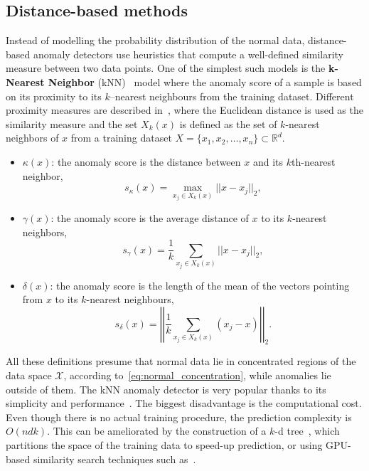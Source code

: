 \subsection{Distance-based methods}
Instead of modelling the probability distribution of the normal data, distance-based anomaly detectors use heuristics that compute a well-defined similarity measure between two data points. One of the simplest such models is the \textbf{k-Nearest Neighbor} (kNN)~\cite{ramaswamy2000efficient} model where the anomaly score of a sample is based on its proximity to its $k$--nearest neighbours from the training dataset. Different proximity measures are described in~\cite{harmeling2006outliers}, where 
the Euclidean distance is used as the similarity measure and the set $X_{k}(x)$ is defined as the set of $k$-nearest neighbors of $x$ from a training dataset $X = \lbrace x_1, x_2, \ldots, x_n \rbrace \subset \mathbb{R}^d$.
\begin{itemize}
	\item $\kappa(x)$: the anomaly score is the distance between $x$ and its $k$th-nearest neighbor,
	\begin{equation} \label{eq:knn_kappa}
		s_{\kappa}(x) =  \max_{x_j \in X_k(x)} \vert \vert x - x_j \vert \vert_2,
	\end{equation}
	\item $\gamma(x)$: the anomaly score is the average distance of $x$ to its $k$-nearest neighbors, 
	\begin{equation} \label{eq:knn_gamma}
		s_{\gamma}(x) =  \frac{1}{k} \sum_{x_j \in X_k(x)} \vert \vert x - x_j \vert \vert_2,
	\end{equation}
	\item $\delta(x)$: the anomaly score is the length of the mean of the vectors pointing from $x$ to its $k$-nearest neighbours,
	\begin{equation} \label{eq:knn_delta}
		s_{\delta}(x) =  \left| \left| \frac{1}{k} \sum_{x_j \in X_k(x)} (x_j - x) \right| \right|_2.
	\end{equation}
\end{itemize}
All these definitions presume that normal data lie in concentrated regions of the data space $\mathcal{X}$, according to~\eqref{eq:normal_concentration}, while anomalies lie outside of them. The kNN anomaly detector is very popular thanks to its simplicity and performance~\cite{campos2016evaluation}. The biggest disadvantage is the computational cost. Even though there is no actual training procedure, the prediction complexity is $O(ndk)$. This can be ameliorated by the construction of a $k$-d tree~\cite{bentley1975multidimensional}, which partitions the space of the training data to speed-up prediction, or using GPU-based similarity search techniques such as~\cite{johnson2019billion}.

